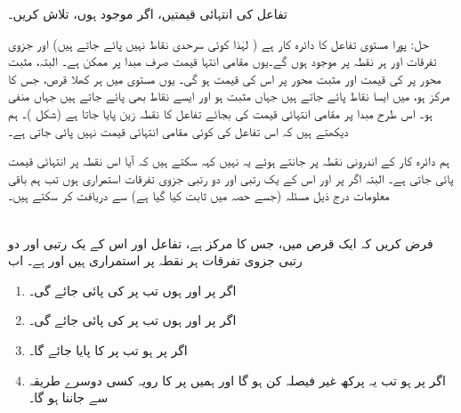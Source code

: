 تفاعل  کی انتہائی قیمتیں، اگر موجود ہوں، تلاش کریں۔

حل:\quad
 پورا مستوی  تفاعل  کا دائرہ کار   ہے ( لہٰذا کوئی سرحدی نقاط نہیں پائے جاتے ہیں) اور جزوی تفرقات  اور  ہر  نقطہ پر موجود ہوں گے۔یوں مقامی انتہا قیمت صرف مبدا پر ممکن ہے۔ البتہ، مثبت  محور پر   کی قیمت  اور مثبت  محور پر اس کی قیمت  ہو گی۔ یوں  مستوی  میں ہر  کھلا قرص، جس کا مرکز   ہو، میں  ایسا نقاط پائے جاتے ہیں جہاں  مثبت ہو اور ایسے نقاط بھی پائے جاتے ہیں جہاں  منفی ہو۔  اس طرح مبدا پر مقامی انتہائی قیمت کی بجائے  تفاعل کا نقطہ زین پایا جاتا ہے (شکل )۔ ہم دیکھتے ہیں کہ اس تفاعل کی  کوئی مقامی انتہائی قیمت نہیں پائی جاتی ہے۔

ہم  دائرہ کار  کے اندرونی نقطہ  پر   جانتے ہوئے یہ نہیں  کہہ سکتے ہیں کہ آیا اس نقطہ پر انتہائی قیمت پائی جاتی ہے۔ البتہ اگر  پر   اور اس کے یک رتبی اور دو رتبی  جزوی تفرقات استمراری ہوں  تب ہم باقی معلومات درج ذیل مسئلہ (جسے حصہ  میں ثابت کیا گیا ہے) سے دریافت کر سکتے ہیں۔

\\
فرض کریں کہ ایک قرص میں، جس  کا مرکز  ہے،  تفاعل  اور اس کے یک رتبی اور دو رتبی   جزوی تفرقات ہر نقطہ پر  استمراری ہیں  اور  ہے۔ اب
\begin{enumerate}[1.]
\item
اگر  پر  اور  ہوں    تب  پر  کی پائی جائے گی۔
\item
اگر  پر  اور  ہوں   تب  پر  کی پائی جائے گی۔
\item
اگر  پر   ہو   تب  پر  کا پایا جائے گا۔
\item
اگر   پر  ہو تب یہ پرکھ غیر فیصلہ کن ہو  گا اور ہمیں  پر  کا رویہ  کسی دوسرے طریقہ سے جاننا ہو گا۔
\end{enumerate}

